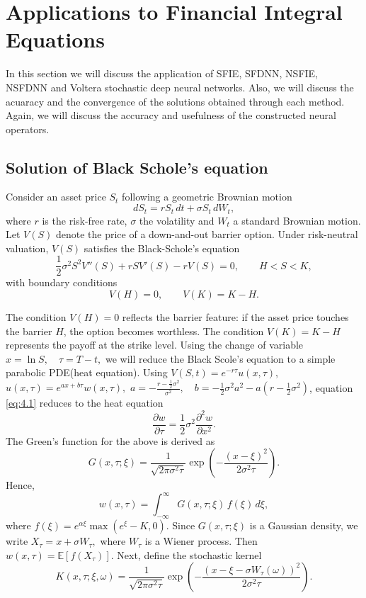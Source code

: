 \documentclass[preprint,12pt,authoryear]{elsarticle}
\begin{document}
\section {Applications to Financial Integral Equations}

In this section we will discuss the application of SFIE, SFDNN, NSFIE, NSFDNN and Voltera stochastic deep neural networks. Also, we will discuss the acuaracy and the convergence of the solutions obtained through each method. Again, we will discuss the accuracy and usefulness of the constructed neural operators.  
\subsection {Solution of Black Schole's equation}
Consider an asset price $S_t$ following a geometric Brownian motion
\[
dS_t = rS_t\,dt + \sigma S_t\,dW_t,
\]
where $r$ is the risk-free rate, $\sigma$ the volatility and $W_t$ a
standard Brownian motion. Let $V(S)$ denote the price of a down-and-out barrier option.
Under risk-neutral valuation, $V(S)$ satisfies the Black-Schole's equation
\begin{equation}
\frac{1}{2}\sigma^2 S^2 V''(S) + rS V'(S) - rV(S) = 0,
\qquad H < S < K,
\label{eq:4.1}
\end{equation}
with boundary conditions
\begin{equation}
V(H) = 0, \qquad V(K) = K-H .
\label{eq:bvp_bc}
\end{equation}

The condition $V(H)=0$ reflects the barrier feature: if the asset price
touches the barrier $H$, the option becomes worthless. The condition
$V(K)=K-H$ represents the payoff at the strike level. Using the change of variable $x = \ln S, \quad \tau = T - t,$ we will reduce the Black Scole's equation to a simple parabolic PDE(heat equation). Using $V(S,t) = e^{-r\tau} u(x,\tau)$, $u(x,\tau) = e^{ax + b\tau} w(x,\tau),$ $a = -\frac{r - \frac{1}{2}\sigma^2}{\sigma^2}, \quad
b = -\frac{1}{2}\sigma^2 a^2 - a\left(r - \frac{1}{2}\sigma^2\right)$, equation \eqref{eq:4.1} reduces to the heat equation
\begin{equation}
\frac{\partial w}{\partial \tau}
= \frac{1}{2}\sigma^2 \frac{\partial^2 w}{\partial x^2}.
\end{equation}
The Green's function for the above is derived as 
\begin{equation}
G(x,\tau;\xi)
=
\frac{1}{\sqrt{2\pi\sigma^2 \tau}}
\exp\left(
-\frac{(x-\xi)^2}{2\sigma^2 \tau}
\right).
\end{equation}
Hence, 
\begin{equation}
w(x,\tau)
=
\int_{-\infty}^{\infty}
G(x,\tau;\xi)\, f(\xi)\, d\xi,
\end{equation}
where
$f(\xi) = e^{\alpha \xi}\max(e^\xi - K,0).$
Since $G(x,\tau;\xi)$ is a Gaussian density, we write $X_\tau = x + \sigma W_\tau,$
where $W_\tau$ is a Wiener process. Then $w(x,\tau)
=\mathbb{E}[f(X_\tau)].$
Next, define the stochastic kernel
\begin{equation}
K(x,\tau;\xi,\omega)
=
\frac{1}{\sqrt{2\pi\sigma^2 \tau}}
\exp\left(
-\frac{(x - \xi - \sigma W_\tau(\omega))^2}{2\sigma^2 \tau}
\right).
\end{equation}
\end{document}
